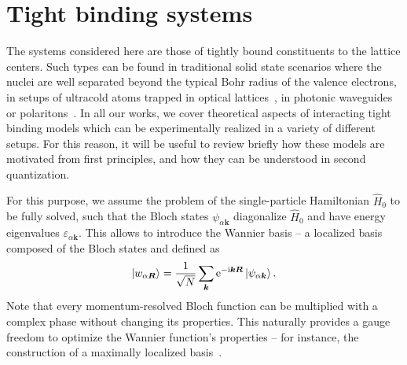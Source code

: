 \section{Tight binding systems}
\label{sec:tight_binding_systems}
%
%
The systems considered here are those of tightly bound constituents to the lattice centers.
Such types can be found in traditional solid state scenarios where the nuclei are well separated beyond the typical Bohr radius of the valence electrons, in setups of ultracold atoms trapped in optical lattices~\cite{Bloch2008}, in photonic waveguides~\cite{Lu2014} or polaritons~\cite{Amo2016}.
In all our works, we cover theoretical aspects of interacting tight binding models which can be experimentally realized in a variety of different setups.
For this reason, it will be useful to review briefly how these models are motivated from first principles, and how they can be understood in second quantization.

For this purpose, we assume the problem of the single-particle Hamiltonian $\hat H_0$ to be fully solved, such that the Bloch states $\psi_{\alpha{\bm k}}$ diagonalize $\hat H_0$ and have energy eigenvalues $\varepsilon_{\alpha{\bm k}}$.
This allows to introduce the Wannier basis -- a localized basis composed of the Bloch states and defined as
\begin{align}
    \ket{w_{\alpha{\bm R}}} = \frac1{\sqrt N}\sum_{\bm k}\mathrm e^{-\mathrm i{\bm k}{\bm R}}\ket{\psi_{\alpha{\bm k}}}.
    \label{eq:wannier_states}
\end{align}
Note that every momentum-resolved Bloch function can be multiplied with a complex phase without changing its properties.
This naturally provides a gauge freedom to optimize the Wannier function's properties -- for instance, the construction of a maximally localized basis~\cite{Marzari2012}.

